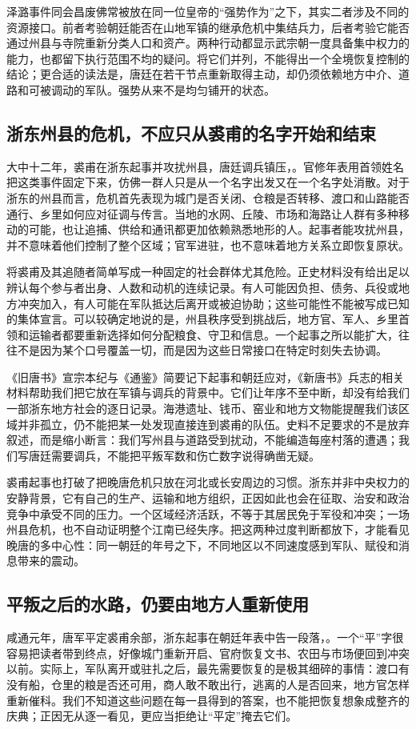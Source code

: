 泽潞事件同会昌废佛常被放在同一位皇帝的“强势作为”之下，其实二者涉及不同的资源接口。前者考验朝廷能否在山地军镇的继承危机中集结兵力，后者考验它能否通过州县与寺院重新分类人口和资产。两种行动都显示武宗朝一度具备集中权力的能力，也都留下执行范围不均的疑问。将它们并列，不能得出一个全境恢复控制的结论；更合适的读法是，唐廷在若干节点重新取得主动，却仍须依赖地方中介、道路和可被调动的军队。强势从来不是均匀铺开的状态。

\subsection{浙东州县的危机，不应只从裘甫的名字开始和结束}
大中十二年，裘甫在浙东起事并攻扰州县，唐廷调兵镇压，。官修年表用首领姓名把这类事件固定下来，仿佛一群人只是从一个名字出发又在一个名字处消散。对于浙东的州县而言，危机首先表现为城门是否关闭、仓粮是否转移、渡口和山路能否通行、乡里如何应对征调与传言。当地的水网、丘陵、市场和海路让人群有多种移动的可能，也让追捕、供给和通讯都更加依赖熟悉地形的人。起事者能攻扰州县，并不意味着他们控制了整个区域；官军进驻，也不意味着地方关系立即恢复原状。

将裘甫及其追随者简单写成一种固定的社会群体尤其危险。正史材料没有给出足以辨认每个参与者出身、人数和动机的连续记录。有人可能因负担、债务、兵役或地方冲突加入，有人可能在军队抵达后离开或被迫协助；这些可能性不能被写成已知的集体宣言。可以较确定地说的是，州县秩序受到挑战后，地方官、军人、乡里首领和运输者都要重新选择如何分配粮食、守卫和信息。一个起事之所以能扩大，往往不是因为某个口号覆盖一切，而是因为这些日常接口在特定时刻失去协调。

《旧唐书》宣宗本纪与《通鉴》简要记下起事和朝廷应对，《新唐书》兵志的相关材料帮助我们把它放在军镇与调兵的背景中。它们让年序不至中断，却没有给我们一部浙东地方社会的逐日记录。海港遗址、钱币、窑业和地方文物能提醒我们该区域并非孤立，仍不能把某一处发现直接连到裘甫的队伍。史料不足要求的不是放弃叙述，而是缩小断言：我们写州县与道路受到扰动，不能编造每座村落的遭遇；我们写唐廷需要调兵，不能把平叛军数和伤亡数字说得确凿无疑。

裘甫起事也打破了把晚唐危机只放在河北或长安周边的习惯。浙东并非中央权力的安静背景，它有自己的生产、运输和地方组织，正因如此也会在征取、治安和政治竞争中承受不同的压力。一个区域经济活跃，不等于其居民免于军役和冲突；一场州县危机，也不自动证明整个江南已经失序。把这两种过度判断都放下，才能看见晚唐的多中心性：同一朝廷的年号之下，不同地区以不同速度感到军队、赋役和消息带来的震动。

\subsection{平叛之后的水路，仍要由地方人重新使用}
咸通元年，唐军平定裘甫余部，浙东起事在朝廷年表中告一段落，。一个“平”字很容易把读者带到终点，好像城门重新开启、官府恢复文书、农田与市场便回到冲突以前。实际上，军队离开或驻扎之后，最先需要恢复的是极其细碎的事情：渡口有没有船，仓里的粮是否还可用，商人敢不敢出行，逃离的人是否回来，地方官怎样重新催科。我们不知道这些问题在每一县得到的答案，也不能把恢复想象成整齐的庆典；正因无从逐一看见，更应当拒绝让“平定”掩去它们。

